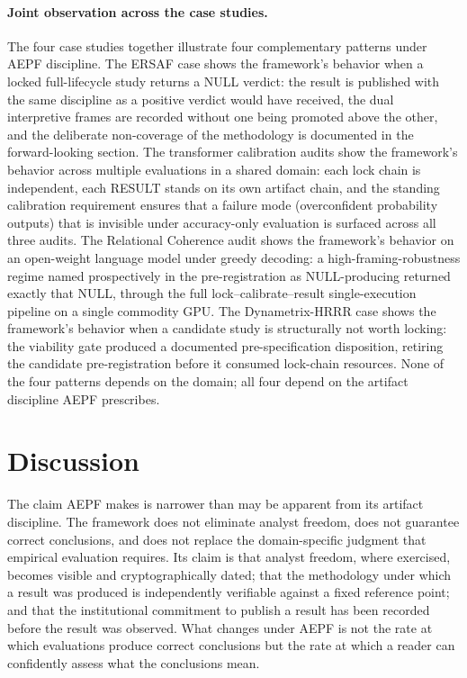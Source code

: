 \documentclass[11pt]{article}
\begin{document}
\paragraph{Joint observation across the case studies.}
The four case studies together illustrate four complementary
patterns under AEPF discipline. The ERSAF case shows the
framework's behavior when a locked full-lifecycle study returns a
NULL verdict: the result is published with the same discipline as
a positive verdict would have received, the dual interpretive
frames are recorded without one being promoted above the other,
and the deliberate non-coverage of the methodology is documented
in the forward-looking section. The transformer calibration
audits show the framework's behavior across multiple evaluations
in a shared domain: each lock chain is independent, each RESULT
stands on its own artifact chain, and the standing calibration
requirement ensures that a failure mode (overconfident probability
outputs) that is invisible under accuracy-only evaluation is
surfaced across all three audits. The Relational Coherence audit
shows the framework's behavior on an open-weight language model under
greedy decoding: a high-framing-robustness regime named prospectively
in the pre-registration as NULL-producing returned exactly that NULL,
through the full lock--calibrate--result single-execution pipeline on
a single commodity GPU. The Dynametrix-HRRR case shows
the framework's behavior when a candidate study is structurally
not worth locking: the viability gate produced a documented
pre-specification disposition, retiring the candidate
pre-registration before it consumed lock-chain resources. None of
the four patterns depends on the domain; all four depend on the
artifact discipline AEPF prescribes.

\section{Discussion}
\label{sec:discussion}

The claim AEPF makes is narrower than may be apparent from its
artifact discipline. The framework does not eliminate analyst freedom,
does not guarantee correct conclusions, and does not replace the
domain-specific judgment that empirical evaluation requires. Its claim
is that analyst freedom, where exercised, becomes visible and
cryptographically dated; that the methodology under which a result was
produced is independently verifiable against a fixed reference point;
and that the institutional commitment to publish a result has been
recorded before the result was observed. What changes under AEPF is
not the rate at which evaluations produce correct conclusions but the
rate at which a reader can confidently assess what the conclusions
mean.
\end{document}
